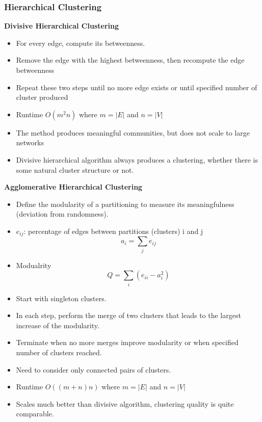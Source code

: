 \documentclass[../notes.tex]{subfiles}
\begin{document}
\subsubsection{Hierarchical Clustering}
\textbf{Divisive Hierarchical Clustering}
\begin{itemize}
  \item For every edge, compute its betweenness.
  \item Remove the edge with the highest betweenness, then recompute the edge betweenness
  \item Repeat these two steps until no more edge exists or until specified number of cluster produced
  \item Runtime $O(m^2n)$ where $m = |E|$ and $n = |V|$
  \item The method produces meaningful communities, but does not scale to large networks
  \item Divisive hierarchical algorithm always produces a clustering, whether there is some natural cluster structure or not.
\end{itemize}

\textbf{Agglomerative Hierarchical Clustering}
\begin{itemize}
  \item Define the modularity of a partitioning to measure its meaningfulness (deviation from randomness).
  \item $e_{ij}$: percentage of edges between partitions (clusters) i and j $$a_i = \sum_j {e_{ij}}$$
  \item Modualrity $$Q = \sum_i (e_{ii} - a_i^2)$$
  \item Start with singleton clusters.
  \item In each step, perform the merge of two clusters that leads to the largest increase of the modularity.
  \item Terminate when no more merges improve modularity or when specified number of clusters reached.
  \item Need to consider only connected pairs of clusters.
  \item Runtime $O((m+n) n)$ where $m = |E|$ and $n = |V|$
  \item Scales much better than divisive algorithm, clustering quality is quite comparable.
\end{itemize}
\end{document}
